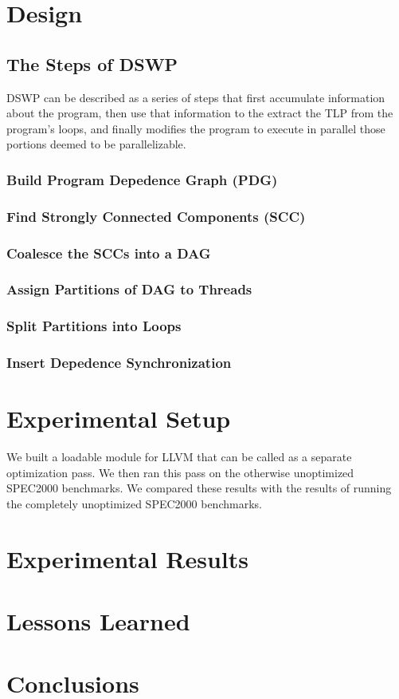 \documentclass[11pt]{article}
\begin{document}
\section{Design}
\subsection{The Steps of DSWP}
DSWP can be described as a series of steps that first accumulate information about the program, then use that information to the extract the TLP from the program's loops, and finally modifies the program to execute in parallel those portions deemed to be parallelizable.

\subsubsection{Build Program Depedence Graph (PDG)}

\subsubsection{Find Strongly Connected Components (SCC)}

\subsubsection{Coalesce the SCCs into a DAG}

\subsubsection{Assign Partitions of DAG to Threads}

\subsubsection{Split Partitions into Loops}

\subsubsection{Insert Depedence Synchronization}

\section{Experimental Setup}
We built a loadable module for LLVM that can be called as a separate optimization pass.  We then ran this pass on the otherwise unoptimized SPEC2000 benchmarks.  We compared these results with the results of running the completely unoptimized SPEC2000 benchmarks.

\section{Experimental Results}


\section{Lessons Learned}


\section{Conclusions}
\end{document}
